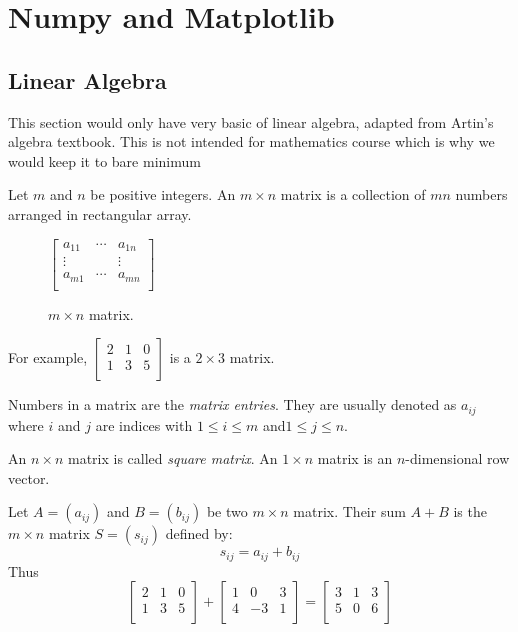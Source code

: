 \chapter{Numpy and Matplotlib}
\section{Linear Algebra}
This section would only have very basic of linear algebra, adapted from Artin's algebra textbook\cite{Artin}. This is not intended for mathematics course which is why we would keep it to bare minimum

\noindent Let $m$ and $n$ be positive integers. An $m \times n$ matrix is a collection of $mn$ numbers arranged in rectangular array.
\begin{figure}[ht]
\centering
$\begin{bmatrix}
	a_{11} & \cdots & a_{1n} \\
	\vdots &  &  \vdots \\
	a_{m1}& \cdots  &a_{mn}  \\
\end{bmatrix}$
\caption{$m \times n$ matrix.}
\label{fig:mn matrix}
\end{figure}

\noindent For example, $\begin{bmatrix}
	2 & 1 & 0 \\
	1& 3  &5  \\
\end{bmatrix}$ is a $2 \times 3$ matrix.

\noindent Numbers in a matrix are the \textit{matrix entries}. They are usually denoted as $a_{ij}$ where $i$ and $j$ are indices with $1\leq i \leq m $ and$1\leq j \leq n $.

\noindent An $n \times n$ matrix is called \textit{square matrix}. An $1 \times n$ matrix is an $n$-dimensional row vector.

\noindent Let $A=(a_{ij})$ and $B=(b_{ij})$ be two $m \times n$ matrix. Their sum $A+B$ is the $m \times n$ matrix $S = (s_{ij})$ defined by:
\begin{equation}\label{matrix addition}
	s_{ij}=a_{ij}+b_{ij} 
\end{equation}
Thus
\begin{equation}
	\begin{bmatrix}
		2&1  &0  \\
		1& 3 &5  \\
	\end{bmatrix}+\begin{bmatrix}
		1 & 0 & 3 \\
		4 & -3 & 1 \\
	\end{bmatrix}=\begin{bmatrix}
		3 & 1 & 3 \\
		5 & 0 & 6 \\
	\end{bmatrix}
\end{equation}

